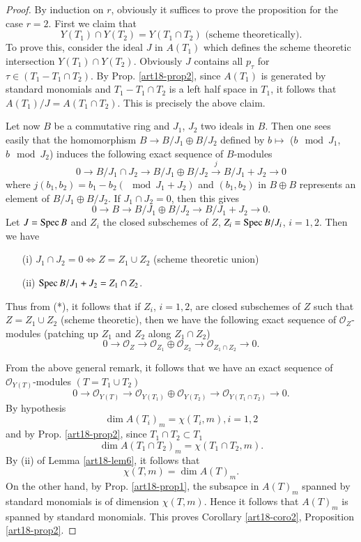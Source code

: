 \begin{proof}
By induction on $r$, obviously it suffices to prove the proposition for the case $r = 2$. First we claim that 
$$
Y(T_1) \cap Y (T_2) = Y(T_1 \cap T_2) \text{ (scheme theoretically).}
$$
To prove this, consider the ideal $J$ in $A(T_1)$ which defines the scheme theoretic intersection $Y(T_1) \cap Y (T_2)$. Obviously $J$ contains all $p_\tau$ for $\tau \in (T_1 - T_1 \cap T_2)$. By Prop. \ref{art18-prop2}, since $A(T_1)$ is generated by standard monomials and $T_1 - T_1 \cap T_2$ is a left half space in $T_1$, it follows that $A(T_1)/ J = A (T_1 \cap T_2)$. This is precisely the above claim.

Let now $B$ be a commutative ring and $J_1$, $J_2$ two ideals in $B$. Then one sees easily that the homomorphism $B \to B / J_1 \oplus B / J_2$ defined by $b \mapsto $ ($b \mod J_1$, $b \mod J_2$) induces the following exact sequence of $B$-modules
$$
0 \to B/ J_1 \cap J_2 \to B / J_1 \oplus B / J_2 \xrightarrow{j} B / J_1 + J_2 \to 0
$$ 
where $j(b_1, b_2) = b_1 - b_2 (\mod J_1 + J_2)$ and $(b_1, b_2)$ in $B \oplus B$ represents an element of $B/ J_1 \oplus B / J_2$. If $J_1 \cap J_2 =0$, then this gives
\begin{equation*}
0 \to B \to B / J_1 \oplus B / J_2 \to B / J_1 + J_2 \to 0. \tag{*}
\end{equation*}
Let $J = \operatorname{Spec} B$ and $Z_i$ the closed subschemes of $Z$, $Z_i = \operatorname{Spec} B/J_i$, $i=1,2$. Then we have 
\begin{itemize}
\item[\rm (i)] $J_1 \cap J_2 = 0 \Leftrightarrow Z = Z_1 \cup Z_2$ (scheme theoretic union)

\item[\rm (ii)] $\operatorname{Spec} B/ J_1 + J_2 = Z_1 \cap Z_2$.\pageoriginale
\end{itemize}
Thus from (*), it follows that if $Z_i$, $i= 1,2$, are closed subschemes of $Z$ such that $Z = Z_1 \cup Z_2$ (scheme theoretic), then we have the following exact sequence of $\mathscr{O}_Z$-modules (patching up $Z_1$ and $Z_2$ along $Z_1 \cap Z_2$)
$$
0 \to \mathscr{O}_Z \to \mathscr{O}_{Z_1} \oplus \mathscr{O}_{Z_2}  \to \mathscr{O}_{Z_1 \cap Z_2} \to 0.
$$

From the above general remark, it follows that we have an exact sequence of $\mathscr{O}_{Y(T)}$-modules $(T = T_1 \cup T_2)$
\begin{equation*}
0 \to \mathscr{O}_{Y(T)} \to \mathscr{O}_{Y(T_1)} \oplus \mathscr{O}_{Y(T_2)} \to \mathscr{O}_{Y(T_1 \cap T_2)} \to 0. \tag*{(2)}\label{art18-eq2}
\end{equation*}
By hypothesis
$$
\dim A(T_i)_m = \chi (T_i, m), i= 1,2
$$
and by Prop. \ref{art18-prop2}, since $T_1 \cap T_2 \subset T_1$
$$
\dim A(T_1 \cap T_2)_m = \chi (T_1 \cap T_2, m).
$$
By (ii) of Lemma \ref{art18-lem6}, it follows that
$$
\chi (T,m) =\dim A(T)_m.
$$
On the other hand, by Prop. \ref{art18-prop1}, the subsapce in $A(T)_m$ spanned by standard monomials is of dimension $\chi(T,m)$. Hence it follows that $A(T)_m$ is spanned by standard monomials. This proves Corollary \ref{art18-coro2}, Proposition \ref{art18-prop2}.
\end{proof}

